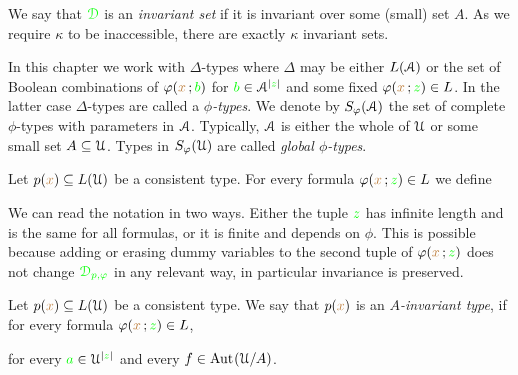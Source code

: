 \documentclass[creche.tex]{subfiles}
\begin{document}
We say that ${\color{green}\EuScript D}$ is an \emph{invariant set\/} if it is invariant over some (small) set $A$. As we require $\kappa$ to be inaccessible, there are exactly $\kappa$ invariant sets.

In this chapter we work with $\Delta$-types where $\Delta$ may be either $L(\EuScript A)$ or the set of Boolean combinations of $\varphi({\color{brown} x}\,;{\color{green} b})$ for ${\color{green} b}\in\EuScript A^{|{\color{green} z}|}$ and some fixed $\varphi({\color{brown} x}\,;{\color{green} z})\in L$. In the latter case  $\Delta$-types are called a \emph{$\phi$-types}. We denote by \emph{$S_{\varphi}(\EuScript A)$\/} the set of complete $\phi$-types with parameters in $\EuScript A$. Typically, $\EuScript A$ is either the whole of $\EuScript U$ or some small set $A\subseteq\EuScript U$.  Types in \emph{$S_{\varphi}(\EuScript U)$\/} are called \emph{global $\phi$-types}.

% 



Let $p({\color{brown} x})\subseteq L(\EuScript U)$ be a consistent type. For every formula $\varphi({\color{brown} x}\,;{\color{green} z})\in L$ we define


We can read the notation in two ways. Either the tuple ${\color{green} z}$ has infinite length and is the same for all formulas, or it is finite and depends on $\phi$. This is possible because adding or erasing dummy variables to the second tuple of $\varphi({\color{brown} x}\,;{\color{green} z})$ does not change ${\color{green}\EuScript D_{p,\varphi}}$ in any relevant way, in particular invariance is preserved. 

Let $p({\color{brown} x})\subseteq L(\EuScript U)$ be a consistent type. We say that $p({\color{brown} x})$ is an \emph{$A$-invariant type\/}, if for every formula $\varphi({\color{brown} x}\,;{\color{green} z})\in L$, 

\hfill for every ${\color{green} a}\in\EuScript U^{|{\color{green} z}|}$ and every $f\in\textrm{Aut\kern.15ex}(\EuScript U/A)$.
\end{document}
